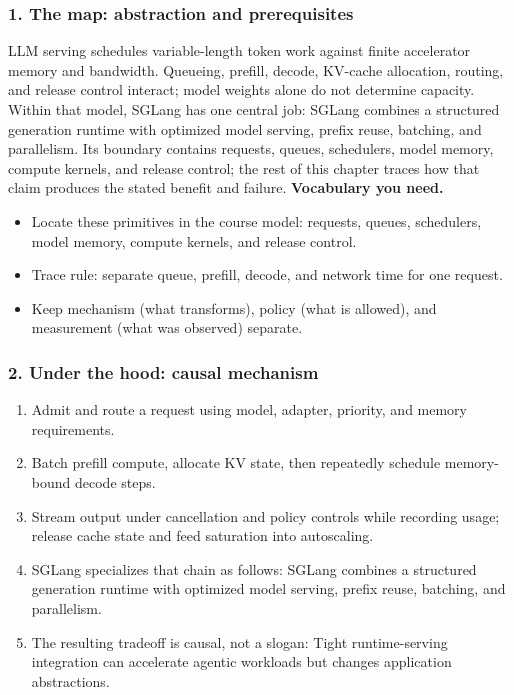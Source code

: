 \subsubsection*{1. The map: abstraction and prerequisites}
LLM serving schedules variable-length token work against finite accelerator memory and bandwidth. Queueing, prefill, decode, KV-cache allocation, routing, and release control interact; model weights alone do not determine capacity.
Within that model, SGLang has one central job: SGLang combines a structured generation runtime with optimized model serving, prefix reuse, batching, and parallelism. Its boundary contains requests, queues, schedulers, model memory, compute kernels, and release control; the rest of this chapter traces how that claim produces the stated benefit and failure.
\textbf{Vocabulary you need.}\begin{itemize}
\item Locate these primitives in the course model: requests, queues, schedulers, model memory, compute kernels, and release control.
\item Trace rule: separate queue, prefill, decode, and network time for one request.
\item Keep mechanism (what transforms), policy (what is allowed), and measurement (what was observed) separate.
\end{itemize}
\subsubsection*{2. Under the hood: causal mechanism}\begin{enumerate}
\item Admit and route a request using model, adapter, priority, and memory requirements.
\item Batch prefill compute, allocate KV state, then repeatedly schedule memory-bound decode steps.
\item Stream output under cancellation and policy controls while recording usage; release cache state and feed saturation into autoscaling.
\item SGLang specializes that chain as follows: SGLang combines a structured generation runtime with optimized model serving, prefix reuse, batching, and parallelism.
\item The resulting tradeoff is causal, not a slogan: Tight runtime-serving integration can accelerate agentic workloads but changes application abstractions.
\end{enumerate}
